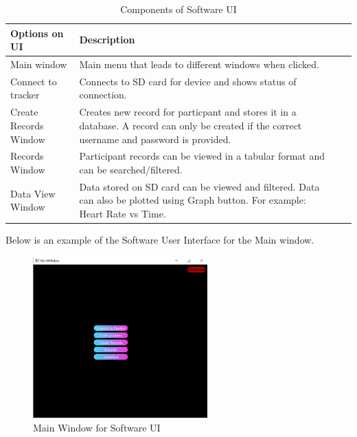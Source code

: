 \documentclass[12pt, titlepage]{article}
\begin{document}
\begin{table}[H]
	\begin{tabularx}{1.05\textwidth} { 
		  | >{\centering\arraybackslash}X 
		  | >{\centering\arraybackslash}X 
		  | >{\centering\arraybackslash}X 
		  | >{\centering\arraybackslash}X | }
		 \hline
		 \textbf{Options on UI} & \textbf{Description}\\
		 \hline
		Main window & Main menu that leads to different windows when clicked.\\
		\hline
		 Connect to tracker  & Connects to SD card for device and shows status of connection.\\
		 \hline
		   Create Records Window & Creates new record for particpant and stores it in a database. A record can only be created if the correct username and password is provided. \\
		\hline 
		Records Window & Participant records can be viewed in a tabular format and can be searched/filtered.\\
		\hline
		Data View Window & Data stored on SD card can be viewed and filtered. Data can also be plotted using Graph button. For example: Heart Rate vs Time.\\
		\hline
	\end{tabularx}
\caption{\label{Software User Interface}Components of Software UI}  
\end{table}

Below is an example of the Software User Interface for the Main window.
\begin{figure}[H]
	\begin{center}
		 \includegraphics[width=0.6\textwidth]{MainWindow}
		\caption{Main Window for Software UI}
		\label{MainWindow} 
	\end{center}
\end{figure}
\end{document}

